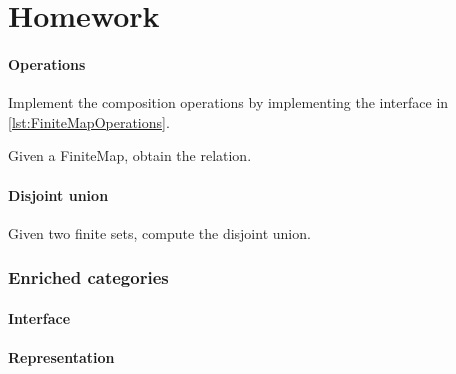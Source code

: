 \part{Homework}



\subsection{Operations}


\begin{gradedexercise}[Composition]
  Implement the composition operations by implementing the interface in \cref{lst:FiniteMapOperations}.
\end{gradedexercise}



\begin{gradedexercise}
  Given a FiniteMap, obtain the relation.


\end{gradedexercise}
\subsection{Disjoint union}
\begin{gradedexercise}
  Given two finite sets, compute the disjoint union.

\end{gradedexercise}














\section{Enriched categories}

\subsection*{Interface}


\subsection*{Representation}



